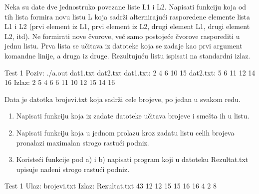

\begin{Exercise}[label=609]
Neka su date dve jednostruko povezane liste L1 i L2. Napisati funkciju koja od 
tih lista formira novu listu L koja sadrži alternirajući rasporedene elemente 
lista L1 i L2 (prvi element iz L1, prvi element iz L2, drugi element L1,
drugi element L2, itd). Ne formirati nove čvorove, već samo postojeće čvorove 
rasporediti u jednu listu. Prva lista se učitava iz datoteke koja se zadaje 
kao prvi argument komandne linije, a druga iz druge. Rezultujuću listu ispisati 
na standardni izlaz.

\begin{miditest}
  \begin{test}{Test 1}
Poziv: ./a.out dat1.txt dat2.txt
dat1.txt: 2 4 6 10 15
dat2.txt: 5 6 11 12 14 16
Izlaz:  2 5 4 6 6 11 10 12 15 14 16
  \end{test}
\end{miditest}

\end{Exercise}
\begin{Answer}[ref=609]
\end{Answer}



\begin{Exercise}[label=610]
Data je datotka brojevi.txt koja sadrži cele brojeve, po jedan u svakom redu.
\begin{enumerate}
 \item Napisati funkciju koja iz zadate datoteke učitava brojeve i smešta ih u listu.
 \item Napisati funkciju koja u jednom prolazu kroz zadatu listu celih brojeva 
pronalazi maximalan strogo rastući podniz.
 \item Koristeći funkcije pod a) i b) napisati program koji u datoteku 
Rezultat.txt upisuje nadeni strogo rastući podniz.
\end{enumerate}


\begin{maxitest}
  \begin{test}{Test 1}
Ulaz:  brojevi.txt       Izlaz: Rezultat.txt
       43                            12
       12                            15
       15                            16
       16
       4
       2
       8
  \end{test}
\end{maxitest}

\end{Exercise}
\begin{Answer}[ref=610]
\end{Answer}



